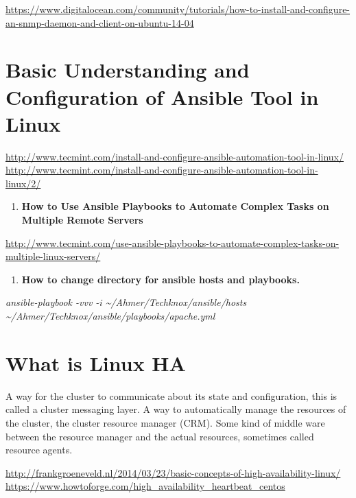 \documentclass[letterpaper,10pt,english]{sphinxmanual}
\begin{document}
\href{https://www.digitalocean.com/community/tutorials/how-to-install-and-configure-an-snmp-daemon-and-client-on-ubuntu-14-04}{https://www.digitalocean.com/community/tutorials/how-to-install-and-configure-an-snmp-daemon-and-client-on-ubuntu-14-04}


\section{Basic Understanding and Configuration of Ansible Tool in Linux}
\label{week-14:basic-understanding-and-configuration-of-ansible-tool-in-linux}
\href{http://www.tecmint.com/install-and-configure-ansible-automation-tool-in-linux/}{http://www.tecmint.com/install-and-configure-ansible-automation-tool-in-linux/}
\href{http://www.tecmint.com/install-and-configure-ansible-automation-tool-in-linux/2/}{http://www.tecmint.com/install-and-configure-ansible-automation-tool-in-linux/2/}
\begin{enumerate}
\item {} 
\textbf{How to Use Ansible Playbooks to Automate Complex Tasks on Multiple Remote Servers}

\end{enumerate}

\href{http://www.tecmint.com/use-ansible-playbooks-to-automate-complex-tasks-on-multiple-linux-servers/}{http://www.tecmint.com/use-ansible-playbooks-to-automate-complex-tasks-on-multiple-linux-servers/}
\begin{enumerate}
\item {} 
\textbf{How to change directory for ansible hosts and playbooks.}

\end{enumerate}

\emph{ansible-playbook -vvv -i \textasciitilde{}/Ahmer/Techknox/ansible/hosts \textasciitilde{}/Ahmer/Techknox/ansible/playbooks/apache.yml}


\section{What is Linux HA}
\label{week-14:what-is-linux-ha}
A way for the cluster to communicate about its state and configuration, this is called a cluster messaging layer.
A way to automatically manage the resources of the cluster, the cluster resource manager (CRM).
Some kind of middle ware between the resource manager and the actual resources, sometimes called resource agents.

\href{http://frankgroeneveld.nl/2014/03/23/basic-concepts-of-high-availability-linux/}{http://frankgroeneveld.nl/2014/03/23/basic-concepts-of-high-availability-linux/}
\href{https://www.howtoforge.com/high\_availability\_heartbeat\_centos}{https://www.howtoforge.com/high\_availability\_heartbeat\_centos}
\end{document}
